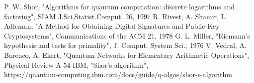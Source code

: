 \documentclass[conference]{IEEEtran}
\begin{document}
\begin{thebibliography}{00}
 P. W. Shor, "Algorithms for quantum computation: discrete logarithms and factoring", SIAM J.Sci.Statist.Comput. 26, 1997
 R. Rivest, A. Shamir, L. Adleman, "A Method for Obtaining Digital Signatures and Public-Key Cryptosystems", Communications of the ACM 21, 1978
 G. L. Miller, "Riemann's hypothesis and tests for primality", J. Comput. System Sci., 1976
 V. Vedral, A. Barenco, A. Ekert, "Quantum Networks for Elementary Arithmetic Operations", Physical Review A 54
 IBM, "Shor's algorithm",\\https://quantum-computing.ibm.com/docs/guide/q-algos/shor-s-algorithm
\end{thebibliography}
\vspace{12pt}
\end{document}
